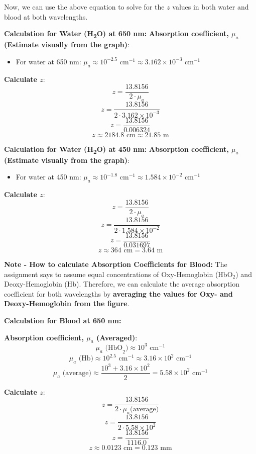 \documentclass[12pt]{article}
\begin{document}
Now, we can use the above equation to solve for the $z$ values in both water and blood at both wavelengths.

\textbf{Calculation for Water (H\textsubscript{2}O) at 650 nm:}
\textbf{Absorption coefficient, \( \mu_a\) (Estimate visually from the graph)}:
\begin{itemize}
    \item For water at 650 nm: \( \mu_a \approx 10^{-2.5} \text{ cm}^{-1} \approx 3.162 \times 10^{-3} \text{ cm}^{-1} \)
\end{itemize}

\textbf{Calculate \( z \)}:
\[ z = \frac{13.8156}{2 \cdot \mu_a} \]
\[ z = \frac{13.8156}{2 \cdot 3.162 \times 10^{-3}} \]
\[ z = \frac{13.8156}{0.006324} \]
\[ z \approx 2184.8 \text{ cm} \approx 21.85 \text{ m} \]

\textbf{Calculation for Water (H\textsubscript{2}O) at 450 nm:}
\textbf{Absorption coefficient, \( \mu_a\) (Estimate visually from the graph)}:
\begin{itemize}
    \item For water at 450 nm: \( \mu_a \approx 10^{-1.8} \text{ cm}^{-1} \approx 1.584 \times 10^{-2} \text{ cm}^{-1} \)
\end{itemize}

\textbf{Calculate \( z \)}:
\[ z = \frac{13.8156}{2 \cdot \mu_a} \]
\[ z = \frac{13.8156}{2 \cdot 1.584 \times 10^{-2}} \]
\[ z = \frac{13.8156}{0.031697} \]
\[ z \approx 364 \text{ cm} = 3.64 \text{ m} \]

\textbf{Note - How to calculate Absorption Coefficients for Blood:}
The assignment says to assume equal concentrations of Oxy-Hemoglobin (HbO\(_2\)) and Deoxy-Hemoglobin (Hb). Therefore, we can calculate the average absorption coefficient for both wavelengths by \textbf{averaging the values for Oxy- and Deoxy-Hemoglobin from the figure}.

\textbf{Calculation for Blood at 650 nm:}

\textbf{Absorption coefficient, \( \mu_a\) (Averaged)}:
\[ \mu_a \text{ (HbO}_2) \approx 10^3 \text{ cm}^{-1} \]
\[ \mu_a \text{ (Hb)} \approx 10^2.5 \text{ cm}^{-1} \approx 3.16 \times 10^2 \text{ cm}^{-1} \]
\[ \mu_a \text{ (average)} \approx \frac{10^3 + 3.16 \times 10^2}{2} = 5.58 \times 10^2 \text{ cm}^{-1} \]

\textbf{Calculate \( z \)}:
\[ z = \frac{13.8156}{2 \cdot \mu_a \text{(average)}} \]
\[ z = \frac{13.8156}{2 \cdot 5.58 \times 10^2} \]
\[ z = \frac{13.8156}{1116.0} \]
\[ z \approx 0.0123 \text{ cm} = 0.123 \text{ mm} \]
\end{document}

